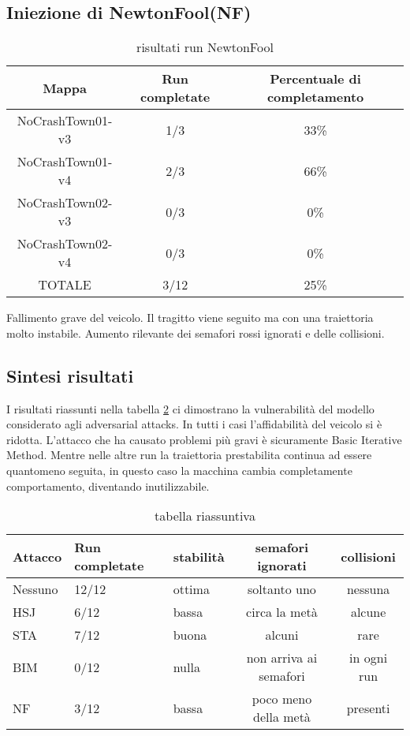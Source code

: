 \subsection{Iniezione di NewtonFool(NF)}
\begin{table}[h!]
    \begin{tabular}{|c|c|c|}
        \hline
        Mappa                   & Run completate & Percentuale di completamento\\
        \hline
        NoCrashTown01-v3        & 1/3            & 33\% \\
        NoCrashTown01-v4        & 2/3            & 66\% \\
        NoCrashTown02-v3        & 0/3            & 0\% \\
        NoCrashTown02-v4        & 0/3            & 0\%  \\
        TOTALE                  & 3/12           & 25\% \\
        \hline
    \end{tabular}
    \caption{risultati run NewtonFool}
    \label{tab:nf}
\end{table}
Fallimento grave del veicolo. Il tragitto viene seguito ma con una traiettoria molto instabile. Aumento rilevante dei semafori rossi ignorati e delle collisioni.
\subsection{Sintesi risultati}
I risultati riassunti nella tabella \ref{tab:ria} ci dimostrano la vulnerabilità del modello considerato agli adversarial attacks. In tutti i casi l'affidabilità del veicolo si è ridotta.
L'attacco che ha causato problemi più gravi è sicuramente Basic Iterative Method. Mentre nelle altre run la traiettoria prestabilita continua ad essere quantomeno seguita, in questo
caso la macchina cambia completamente comportamento, diventando inutilizzabile.
\begin{table}[h]
    \begin{tabular}{|p{1.5cm}|p{2.5cm}|p{2cm}|c|c|}
        \hline
        Attacco        &   Run completate     &   stabilità     &  semafori ignorati & collisioni\\
        \hline
        Nessuno       &  12/12               &   ottima              &  soltanto uno      & nessuna  \\
        HSJ            &  6/12                &   bassa               &  circa la metà     & alcune \\
        STA            &  7/12                &   buona               &  alcuni            & rare \\
        BIM            &  0/12                &   nulla               &  non arriva ai semafori    & in ogni run \\
        NF             &  3/12                &   bassa              &   poco meno della metà      & presenti \\
        \hline
    \end{tabular}
    \caption{tabella riassuntiva}
    \label{tab:ria}
\end{table}